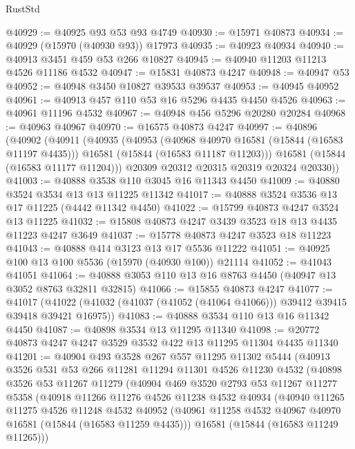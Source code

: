 \begin{lexlean}{RustStd}
\begin{coremodule}
@40929 := @40925 @93 @53 @93 @4749
@40930 := @15971 @40873
@40934 := @40929 (@15970 (@40930 @93)) @17973
@40935 := @40923 @40934
@40940 := @40913 @3451 @459 @53 @266 @10827
@40945 := @40940 @11203 @11213 @4526 @11186 @4532
@40947 := @15831 @40873 @4247
@40948 := @40947 @53
@40952 := @40948 @3450 @10827 @39533 @39537
@40953 := @40945 @40952
@40961 := @40913 @457 @110 @53 @16 @5296 @4435 @4450 @4526
@40963 := @40961 @11196 @4532
@40967 := @40948 @456 @5296 @20280 @20284
@40968 := @40963 @40967
@40970 := @16575 @40873 @4247
@40997 := @40896
    (@40902
      (@40911
        (@40935
          (@40953
            (@40968 @40970 @16581 (@15844 (@16583 @11197 @4435)))
            @16581
            (@15844 (@16583 @11187 @11203)))
          @16581
          (@15844 (@16583 @11177 @11204)))
        @20309
        @20312
        @20315
        @20319
        @20324
        @20330))
@41003 := @40888 @3538 @110 @3045 @16 @11343 @4450
@41009 := @40880 @3524 @3534 @13 @13 @11225 @11342
@41017 := @40888 @3524 @3536 @13 @17 @11225 (@4442 @11342 @4450)
@41022 := @15799 @40873 @4247 @3524 @13 @11225
@41032 := @15808 @40873 @4247 @3439 @3523 @18 @13 @4435 @11223 @4247 @3649
@41037 := @15778 @40873 @4247 @3523 @18 @11223
@41043 := @40888 @414 @3123 @13 @17 @5536 @11222
@41051 := @40925 @100 @13 @100 @5536 (@15970 (@40930 @100)) @21114
@41052 := @41043 @41051
@41064 := @40888 @3053 @110 @13 @16 @8763 @4450 (@40947 @13 @3052 @8763 @32811 @32815)
@41066 := @15855 @40873 @4247
@41077 := @41017
    (@41022 (@41032 (@41037 (@41052 (@41064 @41066))) @39412 @39415 @39418 @39421 @16975))
@41083 := @40888 @3534 @110 @13 @16 @11342 @4450
@41087 := @40898 @3534 @13 @11295 @11340
@41098 := @20772 @40873 @4247 @4247 @3529 @3532 @422 @13 @11295 @11304 @4435 @11340
@41201 := @40904
    @493
    @3528
    @267
    @557
    @11295
    @11302
    @5444
    (@40913
      @3526
      @531
      @53
      @266
      @11281
      @11294
      @11301
      @4526
      @11230
      @4532
      (@40898
        @3526
        @53
        @11267
        @11279
        (@40904
          @469
          @3520
          @2793
          @53
          @11267
          @11277
          @5358
          (@40918
            @11266
            @11276
            @4526
            @11238
            @4532
            @40934
            (@40940
              @11265
              @11275
              @4526
              @11248
              @4532
              @40952
              (@40961 @11258 @4532 @40967 @40970 @16581 (@15844 (@16583 @11259 @4435)))
              @16581
              (@15844 (@16583 @11249 @11265)))

\end{coremodule}
\end{lexlean}
